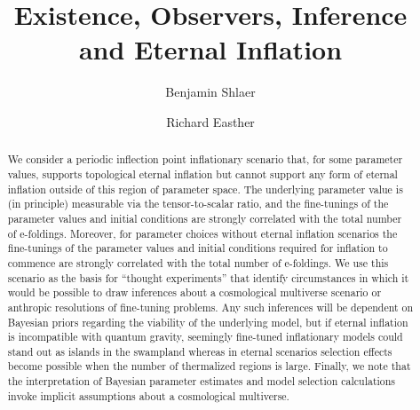 \documentclass[aps,amsfonts,amsmath,prd,preprint,nofootinbib,superscriptaddress]{revtex4}
\begin{document}
\title{Existence, Observers, Inference and Eternal Inflation}

\author{Benjamin Shlaer} 
\author{Richard Easther}



\begin{abstract}

We consider a periodic inflection point inflationary scenario that, for some parameter values, supports  topological eternal inflation but cannot support any form of eternal inflation outside of this region of parameter space. The underlying parameter value is (in principle) measurable via the tensor-to-scalar ratio, and  the fine-tunings of the parameter values and initial conditions are strongly correlated with the total number of e-foldings.  Moreover, for parameter choices without eternal inflation scenarios the fine-tunings of the parameter values and initial conditions required for inflation to commence are strongly correlated with the total number of e-foldings.  We use this scenario as the basis for ``thought experiments'' that identify circumstances in which it would be possible to draw inferences about a cosmological multiverse scenario or anthropic resolutions of fine-tuning problems. Any such inferences will be dependent on Bayesian priors regarding the viability of the underlying model, but if eternal inflation is incompatible with quantum gravity,  seemingly fine-tuned inflationary models could stand out as islands in the swampland whereas in eternal scenarios selection effects become possible when the number of thermalized regions is large.  Finally, we note that the interpretation of Bayesian parameter estimates and model selection calculations invoke implicit assumptions about a cosmological multiverse.   



\end{abstract}
\end{document}
